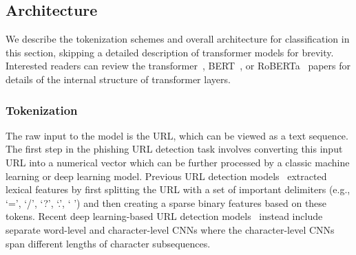 \subsection{Architecture}
We describe the tokenization schemes and overall architecture for classification in this section, skipping a detailed description of transformer models for brevity.
Interested readers can review the transformer~\citep{vaswani2017attention}, BERT~\cite{devlin2019bert}, or RoBERTa~\citep{liu2019roberta} papers for details of the internal structure of transformer layers.

\subsubsection{Tokenization}
\label{sec:urltran:architecture:tokenization}
%
The raw input to the \URLTranSys model is the URL, which can be viewed as a text sequence.
The first step in the phishing URL detection task involves converting this input URL into a numerical vector which can be further processed by a classic machine learning or deep learning model.
Previous URL detection models~\citep{blum2020lexical} extracted lexical features by first splitting the URL with a set of important delimiters (e.g., `=', `/', `?', `.', ` ') and then creating a sparse binary features based on these tokens.
Recent deep learning-based URL detection models~\citep{le2018malicious,tajaddodianfar2020texception} instead include separate word-level and character-level CNNs where the character-level CNNs span different lengths of character subsequences.

